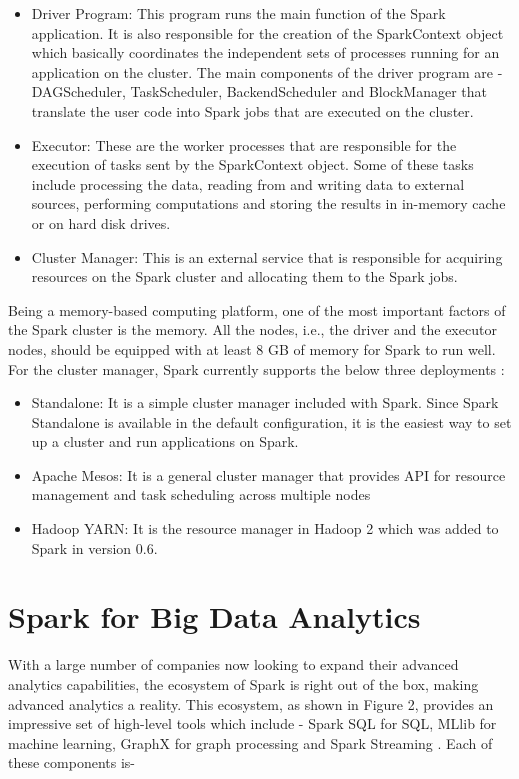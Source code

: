 \documentclass[sigconf]{acmart}
\begin{document}
\begin{itemize}
	\item Driver Program: This program runs the main function of the Spark application. It is also responsible for the creation of the SparkContext object which basically coordinates the independent sets of processes running for an application on the cluster. The main components of the driver program are - DAGScheduler, TaskScheduler, BackendScheduler and BlockManager that translate the user code into Spark jobs that are executed on the cluster.
	\item Executor: These are the worker processes that are responsible for the execution of tasks sent by the SparkContext object. Some of these tasks include processing the data, reading from and writing data to external sources, performing computations and storing the results in in-memory cache or on hard disk drives.
	\item Cluster Manager: This is an external service that is responsible for acquiring resources on the Spark cluster and allocating them to the Spark jobs.
\end{itemize}

Being a memory-based computing platform, one of the most important factors of the Spark cluster is the memory. All the nodes, i.e., the driver and the executor nodes, should be equipped with at least 8 GB of memory for Spark to run well. For the cluster manager, Spark currently supports the below three deployments \cite{fu2016spark-p1}:

\begin{itemize}
	\item Standalone: It is a simple cluster manager included with Spark. Since Spark Standalone is available in the default configuration, it is the easiest way to set up a cluster and run applications on Spark.
	\item Apache Mesos: It is a general cluster manager that provides API for resource management and task scheduling across multiple nodes
	\item Hadoop YARN: It is the resource manager in Hadoop 2 which was added to Spark in version 0.6.
\end{itemize}

\section{Spark for Big Data Analytics}
With a large number of companies now looking to expand their advanced analytics capabilities, the ecosystem of Spark is right out of the box, making advanced analytics a reality. This ecosystem, as shown in Figure 2, provides an impressive set of high-level tools which include - Spark SQL for SQL, MLlib for machine learning, GraphX for graph processing and Spark Streaming \cite{fu2016spark-p1}. Each of these components is-
\end{document}
